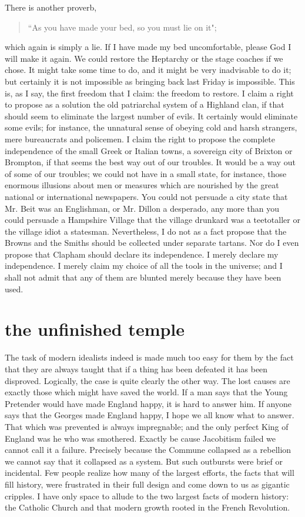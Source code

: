 \documentclass[final,10pt,letterpaper,twocolumn,openany]{book}
\begin{document}
There is another proverb,
\begin{quotation}\noindent
	``As you have made your bed, so you must
	lie on it";
\end{quotation}
 which again is simply a lie. If I have made my bed
uncomfortable, please God I will make it again. We could restore the
Heptarchy or the stage coaches if we chose. It might take some time to do,
and it might be very inadvisable to do it; but certainly it is not impossible
as bringing back last Friday is impossible. This is, as I say, the first
freedom that I claim: the freedom to restore. I claim a right to propose as a
solution the old patriarchal system of a Highland clan, if that should seem
to eliminate the largest number of evils. It certainly would eliminate some
evils; for instance, the unnatural sense of obeying cold and harsh strangers,
mere bureaucrats and policemen. I claim the right to propose the complete
independence of the small Greek or Italian towns, a sovereign city of
Brixton or Brompton, if that seems the best way out of our troubles. It
would be a way out of some of our troubles; we could not have in a small
state, for instance, those enormous illusions about men or measures which
are nourished by the great national or international newspapers. You could
not persuade a city state that Mr. Beit was an Englishman, or Mr. Dillon a
desperado, any more than you could persuade a Hampshire Village that the
village drunkard was a teetotaller or the village idiot a statesman.
Nevertheless, I do not as a fact propose that the Browns and the Smiths
should be collected under separate tartans. Nor do I even propose that
Clapham should declare its independence. I merely declare my
independence. I merely claim my choice of all the tools in the universe;
and I shall not admit that any of them are blunted merely because they
have been used.

\section{the unfinished temple}

    The task of modern idealists indeed is made much too easy for them
by the fact that they are always taught that if a thing has been defeated it
has been disproved. Logically, the case is quite clearly the other way. The
lost causes are exactly those which might have saved the world. If a man
says that the Young Pretender would have made England happy, it is hard
to answer him. If anyone says that the Georges made England happy, I
hope we all know what to answer. That which was prevented is always
impregnable; and the only perfect King of England was he who was
smothered. Exactly be cause Jacobitism failed we cannot call it a failure.
Precisely because the Commune collapsed as a rebellion we cannot say
that it collapsed as a system. But such outbursts were brief or incidental.
Few people realize how many of the largest efforts, the facts that will fill
history, were frustrated in their full design and come down to us as
gigantic cripples. I have only space to allude to the two largest facts of
modern history: the Catholic Church and that modern growth rooted in the
French Revolution.
\end{document}
